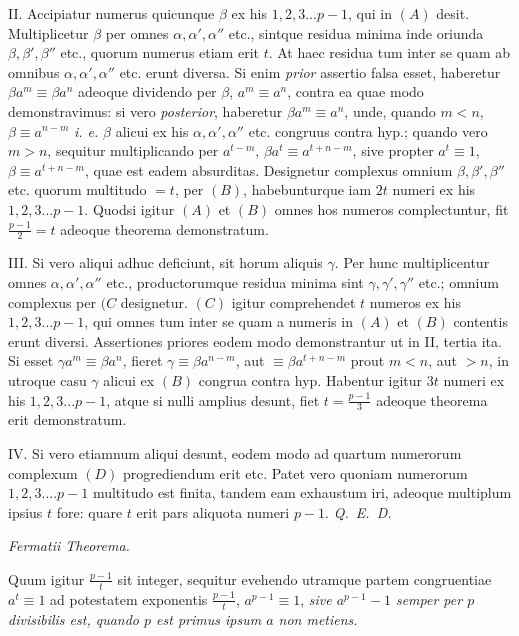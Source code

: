 II. Accipiatur numerus quicunque $\beta$ ex his $1,2,3...p-1$, qui in $(A)$ desit. Multiplicetur $\beta$ per omnes $\alpha,\alpha',\alpha''$ etc., sintque residua minima inde oriunda $\beta,\beta',\beta''$ etc., quorum numerus etiam erit $t$. At haec residua tum inter se quam ab omnibus $\alpha,\alpha',\alpha''$ etc. erunt diversa. Si enim \emph{prior} assertio falsa esset, haberetur $\beta a^m\equiv\beta a^n$ adeoque dividendo per $\beta$, $a^m\equiv a^n$, contra ea quae modo demonstravimus: si vero \emph{posterior}, haberetur $\beta a^m\equiv a^n$, unde, quando $m<n$, $\beta\equiv a^{n-m}$ \emph{i. e.} $\beta$ alicui ex his $\alpha,\alpha',\alpha''$ etc. congruus contra hyp.; quando vero $m>n$, sequitur multiplicando per $a^{t-m}$, $\beta a^t\equiv a^{t+n-m}$, sive propter $a^t\equiv1$, $\beta\equiv a^{t+n-m}$, quae est eadem absurditas. Designetur complexus omnium $\beta,\beta',\beta''$ etc. quorum multitudo $=t$, per $(B)$, habebunturque iam $2t$ numeri ex his $1,2,3...p-1$. Quodsi igitur $(A)$ et $(B)$ omnes hos numeros complectuntur, fit $\frac{p-1}{2}=t$ adeoque theorema demonstratum.

III. Si vero aliqui adhuc deficiunt, sit horum aliquis $\gamma$. Per hunc multiplicentur omnes $\alpha,\alpha',\alpha''$ etc., productorumque residua minima sint $\gamma,\gamma',\gamma''$ etc.; omnium complexus per $(C$ designetur. $(C)$ igitur comprehendet $t$ numeros ex his $1,2,3...p-1$, qui omnes tum inter se quam a numeris in $(A)$ et $(B)$
contentis erunt diversi. Assertiones priores eodem modo demonstrantur ut in II, tertia ita. Si esset $\gamma a^m\equiv\beta a^n$, fieret $\gamma\equiv\beta a^{n-m}$, aut $\equiv\beta a^{t+n-m}$ prout $m<n$, aut $>n$, in utroque casu $\gamma$ alicui ex $(B)$ congrua contra hyp. Habentur igitur $3t$ numeri ex his $1,2,3...p-1$, atque si nulli amplius desunt, fiet $t=\frac{p-1}{3}$ adeoque theorema erit demonstratum.

IV. Si vero etiamnum aliqui desunt, eodem modo ad quartum numerorum complexum $(D)$ progrediendum erit etc. Patet vero quoniam numerorum $1,2,3....p-1$ multitudo est finita, tandem eam exhaustum iri, adeoque multiplum ipsius $t$ fore: quare $t$ erit pars aliquota numeri $p-1$. \mbox{\emph{Q. E. D.}}

\begin{center}\small\emph{Fermatii Theorema.}\end{center}


Quum igitur $\frac{p-1}{t}$ sit integer, sequitur evehendo utramque partem congruentiae $a^t\equiv1$ ad potestatem exponentis $\frac{p-1}{t}$, $a^{p-1}\equiv1$, \emph{sive $a^{p-1}-1$ semper per $p$ divisibilis est, quando $p$ est primus ipsum $a$ non metiens.}

